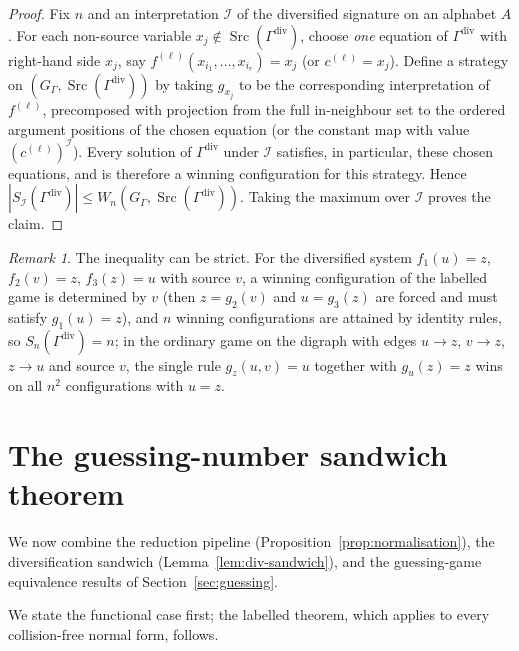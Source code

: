 \documentclass[11pt]{article}
\theoremstyle{plain}
\theoremstyle{definition}
\theoremstyle{definition}
\theoremstyle{remark}
\newtheorem*{remark*}{Remark}
\newcommand{\A}{A}
\newcommand{\Sn}{S_n}
\newcommand{\abs}[1]{\left\lvert #1 \right\rvert}
\newcommand{\Src}{\operatorname{Src}}
\begin{document}
\begin{proof}
Fix $n$ and an interpretation $\mathcal I$ of the diversified signature on an alphabet $\A$.
For each non-source variable $x_j\notin\Src(\Gamma^{\mathrm{div}})$, choose \emph{one} equation of
$\Gamma^{\mathrm{div}}$ with right-hand side $x_j$, say
\(f^{(\ell)}(x_{i_1},\dots,x_{i_r})=x_j\) (or $c^{(\ell)}=x_j$).
Define a strategy on $(G_{\Gamma},\Src(\Gamma^{\mathrm{div}}))$ by taking $g_{x_j}$ to be the corresponding
interpretation of $f^{(\ell)}$, precomposed with projection from the full in-neighbour set to the ordered argument
positions of the chosen equation (or the constant map with value $(c^{(\ell)})^{\mathcal I}$).
Every solution of $\Gamma^{\mathrm{div}}$ under $\mathcal I$ satisfies, in particular, these chosen equations, and is
therefore a winning configuration for this strategy.
Hence
\(
  \abs{S_{\mathcal I}(\Gamma^{\mathrm{div}})}\le W_n(G_{\Gamma},\Src(\Gamma^{\mathrm{div}})).
\)
Taking the maximum over $\mathcal I$ proves the claim.
\end{proof}

\begin{remark*}
The inequality can be strict.  For the diversified system $f_1(u)=z$, $f_2(v)=z$, $f_3(z)=u$
with source $v$, a winning configuration of the labelled game is determined by $v$ (then
$z=g_2(v)$ and $u=g_3(z)$ are forced and must satisfy $g_1(u)=z$), and $n$ winning
configurations are attained by identity rules, so $\Sn(\Gamma^{\mathrm{div}})=n$; in the
ordinary game on the digraph with edges
$u\to z$, $v\to z$, $z\to u$ and source $v$, the single rule $g_z(u,v)=u$ together with
$g_u(z)=z$ wins on all $n^2$ configurations with $u=z$.
\end{remark*}

\section{The guessing-number sandwich theorem}
\label{sec:sandwich}

We now combine the reduction pipeline (Proposition~\ref{prop:normalisation}), the diversification sandwich
(Lemma~\ref{lem:div-sandwich}), and the guessing-game equivalence results of Section~\ref{sec:guessing}.

We state the functional case first; the labelled theorem, which applies to every collision-free
normal form, follows.
\end{document}
